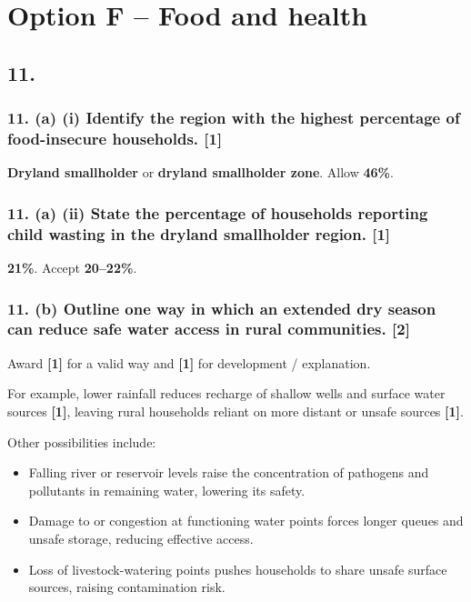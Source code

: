 \documentclass[11pt,a4paper]{article}
\newcommand{\term}[1]{\textbf{#1}}
\begin{document}
\newpage

\section*{Option F -- Food and health}

\subsection*{11.}

\subsubsection*{11. (a) (i) Identify the region with the highest percentage of food-insecure households. \hfill[1]}

\term{Dryland smallholder} or \term{dryland smallholder zone}. Allow \term{46\%}.

\subsubsection*{11. (a) (ii) State the percentage of households reporting child wasting in the dryland smallholder region. \hfill[1]}

\term{21\%}. Accept \term{20--22\%}.

\subsubsection*{11. (b) Outline one way in which an extended dry season can reduce safe water access in rural communities. \hfill[2]}

Award \term{[1]} for a valid way and \term{[1]} for development /
explanation.

For example, lower rainfall reduces recharge of shallow wells and surface
water sources \term{[1]}, leaving rural households reliant on more distant
or unsafe sources \term{[1]}.

Other possibilities include:
\begin{itemize}
  \item Falling river or reservoir levels raise the concentration of pathogens
  and pollutants in remaining water, lowering its safety.
  \item Damage to or congestion at functioning water points forces longer
  queues and unsafe storage, reducing effective access.
  \item Loss of livestock-watering points pushes households to share unsafe
  surface sources, raising contamination risk.
\end{itemize}
\end{document}
